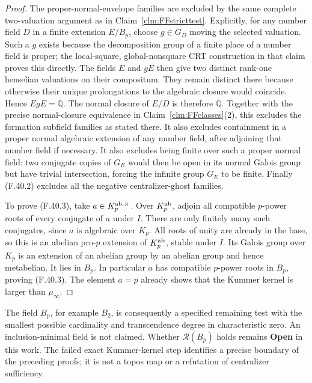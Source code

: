 \documentclass[11pt]{article}
\begin{document}
\begin{proof}
The proper-normal-envelope families
are excluded by the same complete
two-valuation argument as in
Claim~\ref{clm:FFstricttest}.
Explicitly, for any number field
\(D\) in a finite extension
\(E/B_p\), choose
\(g\in G_D\) moving the selected
valuation. Such a \(g\) exists
because the decomposition group
of a finite place of a number
field is proper; the local-square,
global-nonsquare CRT construction
in that claim proves this directly.
The fields \(E\) and \(gE\)
then give two distinct rank-one
henselian valuations on their
compositum. They remain distinct
there because otherwise their
unique prolongations to the
algebraic closure would coincide.
Hence \(EgE=\overline{\mathbb Q}\).
The normal closure of \(E/D\)
is therefore \(\overline{\mathbb Q}\).
Together with the precise normal-closure
equivalence in Claim~\ref{clm:FFclasses}(2),
this excludes the formation subfield
families as stated there. It also
excludes containment in a
proper normal algebraic extension
of any number field, after
adjoining that number field if
necessary. It also excludes being
finite over such a proper normal
field: two conjugate copies of
\(G_E\) would then be open in
its normal Galois group but have
trivial intersection, forcing
the infinite group \(G_E\) to
be finite. Finally (F.40.2)
excludes all the negative
centralizer-ghost families.

To prove (F.40.3), take
\(a\in K_p^{{\rm ab},\times}\).
Over \(K_p^{\rm ab}\), adjoin
all compatible \(p\)-power
roots of every conjugate of
\(a\) under \(I\). There are
only finitely many such conjugates,
since \(a\) is algebraic over
\(K_p\). All roots of unity
are already in the base, so
this is an abelian pro-\(p\)
extension of \(K_p^{\rm ab}\),
stable under \(I\). Its Galois
group over \(K_p\) is an
extension of an abelian group
by an abelian group and hence
metabelian. It lies in \(B_p\).
In particular \(a\) has
compatible \(p\)-power roots
in \(B_p\), proving (F.40.3).
The element \(a=p\) already
shows that the Kummer kernel
is larger than \(\mu_\infty\).
\end{proof}

The field \(B_p\), for example \(B_2\),
is consequently a specified remaining
test with the smallest possible
cardinality and transcendence degree
in characteristic zero. An
inclusion-minimal field is not
claimed. Whether \(\mathcal R(B_p)\)
holds remains \textbf{Open} in
this work. The failed exact
Kummer-kernel step identifies a
precise boundary of the preceding
proofs; it is not a topos map or
a refutation of centralizer
sufficiency.
\end{document}
